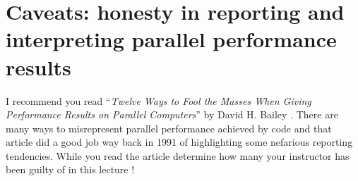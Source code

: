 \section{Caveats: honesty in reporting and interpreting parallel performance results}

I recommend you read ``\emph{Twelve Ways to Fool the Masses When Giving Performance Results on Parallel Computers}'' by David H. Bailey \cite{bailey199112}. There are many ways to misrepresent parallel performance achieved by code and that article did a good job way back in 1991 of highlighting some nefarious reporting tendencies. While you read the article determine how many your instructor has been guilty of in this lecture !


\printbibliography[heading=subbibliography]
